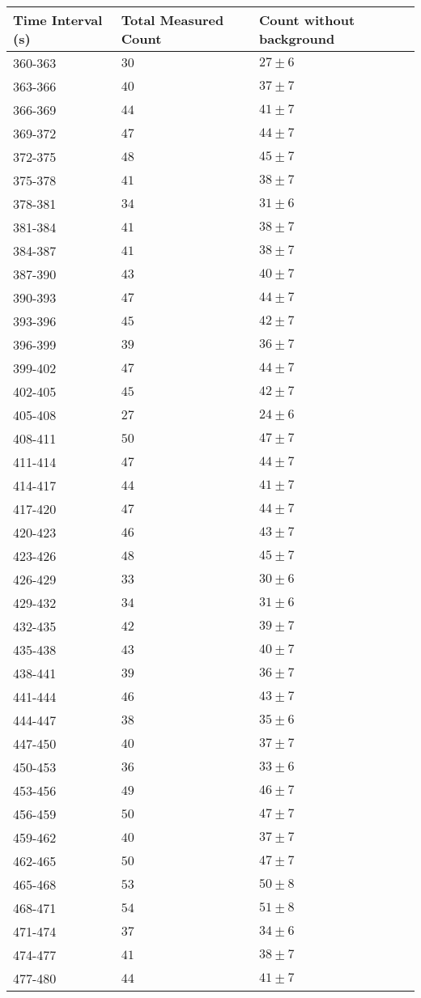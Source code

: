 \begin{tabular}{| p{} | p{} | p{} |}\hline
Time Interval (s) & Total Measured Count & Count without background\\
\hline
360-363 & $30$ & $27\pm 6$\\
363-366 & $40$ & $37\pm 7$\\
366-369 & $44$ & $41\pm 7$\\
369-372 & $47$ & $44\pm 7$\\
372-375 & $48$ & $45\pm 7$\\
375-378 & $41$ & $38\pm 7$\\
378-381 & $34$ & $31\pm 6$\\
381-384 & $41$ & $38\pm 7$\\
384-387 & $41$ & $38\pm 7$\\
387-390 & $43$ & $40\pm 7$\\
390-393 & $47$ & $44\pm 7$\\
393-396 & $45$ & $42\pm 7$\\
396-399 & $39$ & $36\pm 7$\\
399-402 & $47$ & $44\pm 7$\\
402-405 & $45$ & $42\pm 7$\\
405-408 & $27$ & $24\pm 6$\\
408-411 & $50$ & $47\pm 7$\\
411-414 & $47$ & $44\pm 7$\\
414-417 & $44$ & $41\pm 7$\\
417-420 & $47$ & $44\pm 7$\\
420-423 & $46$ & $43\pm 7$\\
423-426 & $48$ & $45\pm 7$\\
426-429 & $33$ & $30\pm 6$\\
429-432 & $34$ & $31\pm 6$\\
432-435 & $42$ & $39\pm 7$\\
435-438 & $43$ & $40\pm 7$\\
438-441 & $39$ & $36\pm 7$\\
441-444 & $46$ & $43\pm 7$\\
444-447 & $38$ & $35\pm 6$\\
447-450 & $40$ & $37\pm 7$\\
450-453 & $36$ & $33\pm 6$\\
453-456 & $49$ & $46\pm 7$\\
456-459 & $50$ & $47\pm 7$\\
459-462 & $40$ & $37\pm 7$\\
462-465 & $50$ & $47\pm 7$\\
465-468 & $53$ & $50\pm 8$\\
468-471 & $54$ & $51\pm 8$\\
471-474 & $37$ & $34\pm 6$\\
474-477 & $41$ & $38\pm 7$\\
477-480 & $44$ & $41\pm 7$\\
\hline
\end{tabular}\\
